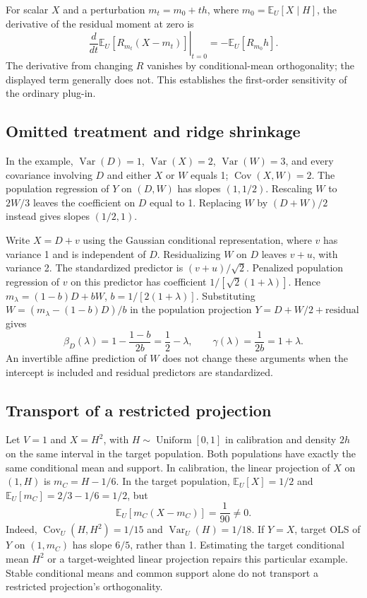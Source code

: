\documentclass[11pt]{article}
\newcommand{\E}{\mathbb{E}}
\begin{document}
For scalar $X$ and a perturbation $m_t=m_0+t h$, where $m_0=\E_U[X\mid H]$, the derivative of the residual moment at zero is
\begin{equation}
\left.\frac{d}{dt}\E_U[R_{m_t}(X-m_t)]\right|_{t=0}
=-\E_U[R_{m_0}h].
\end{equation}
The derivative from changing $R$ vanishes by conditional-mean orthogonality; the displayed term generally does not. This establishes the first-order sensitivity of the ordinary plug-in.

\subsection{Omitted treatment and ridge shrinkage}
In the example, $\operatorname{Var}(D)=1$, $\operatorname{Var}(X)=2$, $\operatorname{Var}(W)=3$, and every covariance involving $D$ and either $X$ or $W$ equals 1; $\operatorname{Cov}(X,W)=2$. The population regression of $Y$ on $(D,W)$ has slopes $(1,1/2)$. Rescaling $W$ to $2W/3$ leaves the coefficient on $D$ equal to 1. Replacing $W$ by $(D+W)/2$ instead gives slopes $(1/2,1)$.

Write $X=D+v$ using the Gaussian conditional representation, where $v$ has variance 1 and is independent of $D$. Residualizing $W$ on $D$ leaves $v+u$, with variance 2. The standardized predictor is $(v+u)/\sqrt 2$. Penalized population regression of $v$ on this predictor has coefficient $1/[\sqrt 2(1+\lambda)]$. Hence $m_\lambda=(1-b)D+bW$, $b=1/[2(1+\lambda)]$. Substituting $W=(m_\lambda-(1-b)D)/b$ in the population projection $Y=D+W/2+\text{residual}$ gives
\begin{equation}
\beta_D(\lambda)=1-\frac{1-b}{2b}=\frac12-\lambda,
\qquad \gamma(\lambda)=\frac{1}{2b}=1+\lambda.
\end{equation}
An invertible affine prediction of $W$ does not change these arguments when the intercept is included and residual predictors are standardized.

\subsection{Transport of a restricted projection}
Let $V=1$ and $X=H^2$, with $H\sim\operatorname{Uniform}[0,1]$ in calibration and density $2h$ on the same interval in the target population. Both populations have exactly the same conditional mean and support. In calibration, the linear projection of $X$ on $(1,H)$ is $m_C=H-1/6$. In the target population, $\E_U[X]=1/2$ and $\E_U[m_C]=2/3-1/6=1/2$, but
\begin{equation}
\E_U[m_C(X-m_C)]=\frac{1}{90}\ne0.
\end{equation}
Indeed, $\operatorname{Cov}_U(H,H^2)=1/15$ and $\operatorname{Var}_U(H)=1/18$. If $Y=X$, target OLS of $Y$ on $(1,m_C)$ has slope $6/5$, rather than 1. Estimating the target conditional mean $H^2$ or a target-weighted linear projection repairs this particular example. Stable conditional means and common support alone do not transport a restricted projection's orthogonality.
\end{document}
